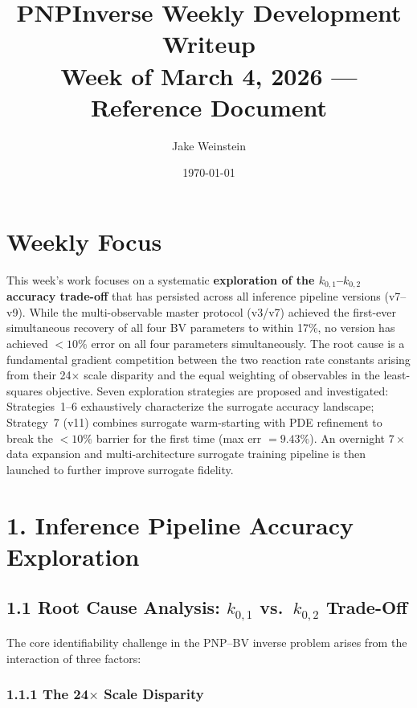 \documentclass[11pt]{article}
\title{PNPInverse Weekly Development Writeup\\Week of March 4, 2026 --- Reference Document}
\author{Jake Weinstein}
\date{\today}
\begin{document}
\onehalfspacing
\maketitle

\section*{Weekly Focus}

This week's work focuses on a systematic \textbf{exploration of the
$k_{0,1}$--$k_{0,2}$ accuracy trade-off} that has persisted across all
inference pipeline versions (v7--v9).  While the multi-observable master
protocol (v3/v7) achieved the first-ever simultaneous recovery of all four BV
parameters to within 17\%, no version has achieved $<10\%$ error on all four
parameters simultaneously.  The root cause is a fundamental gradient
competition between the two reaction rate constants arising from their 24$\times$
scale disparity and the equal weighting of observables in the least-squares
objective.  Seven exploration strategies are proposed and investigated:
Strategies~1--6 exhaustively characterize the surrogate accuracy landscape;
Strategy~7 (v11) combines surrogate warm-starting with PDE refinement to
break the $<10\%$ barrier for the first time (max err $= 9.43\%$).
An overnight $7\times$ data expansion and multi-architecture surrogate
training pipeline is then launched to further improve surrogate fidelity.


\section*{1. Inference Pipeline Accuracy Exploration}

\subsection*{1.1 Root Cause Analysis: $k_{0,1}$ vs.\ $k_{0,2}$ Trade-Off}

The core identifiability challenge in the PNP--BV inverse problem arises from
the interaction of three factors:

\subsubsection*{1.1.1 The 24$\times$ Scale Disparity}
\end{document}
